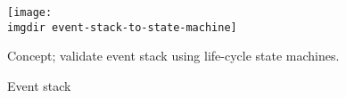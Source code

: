 \begin{figure}[ht]
\centering
\texttt{[image: \\imgdir event-stack-to-state-machine]}
\caption{Concept; validate event stack using life-cycle state machines.}
\label{fig:event-stack-to-state-machine}
\end{figure}

\begin{figure}[ht]
\centering
\begin{drawstack}
\end{drawstack}
\caption{Event stack}
\label{fig:event-stack-example}
\end{figure}
